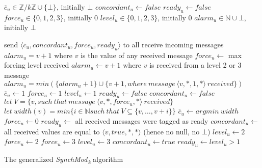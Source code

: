 \documentclass[11pt,letterpaper]{article}
\newcommand{\SM}{{\em SynchMod}$_{\,k}\ $}
\begin{document}
\begin{algorithm}[htb]\label{algo:code}
\begin{distribalgo}[1]
\BLANK {}
	\STATE $\overline{c}_u \in \mathds{Z}/k\mathds{Z} \cup \{\bot\}$, initially $\bot$
	\STATE $concordant_u \leftarrow false$
	\STATE $ready_u \leftarrow false$
	\STATE $force_u \in \{0, 1, 2, 3\}$, initially 0
	\STATE $level_u \in \{0, 1, 2, 3\}$, initially 0
	\STATE $alarm_u \in \mathds{N} \cup \bot$, initially $\bot$

\ENDINDENT \BLANK

	\STATE send $\langle \overline{c}_u, concordant_u, force_u, ready_u \rangle$ to all 
	\STATE receive incoming messages
		\STATE $alarm_u = v+1$ where $v$ is the value of any received message
	\ENDIF
	\STATE $force_u \leftarrow$ max forcing level received
		\STATE $alarm_u \leftarrow v+1$ where $v$ is received from a level 2 or 3 message
	\ELSE
		\STATE $alarm_u = min (\{alarm_u+1\} \cup \{v+1, where~message~\langle v, *, 1, * \rangle~received\})$
	\ENDIF
		\STATE $\overline{c}_u \leftarrow 1$
		\STATE $force_u \leftarrow 1$
		\STATE $level_u \leftarrow 1$
		\STATE $ready_u \leftarrow false$
		\STATE $concordant_u \leftarrow false$
	\ELSE
		\STATE $let~V = \{v, such~that~message~\langle v, *, force_u, * \rangle~received\}$
		\STATE $let~width(v) = min \{i \in \mathds{N} such~that~V \subseteq \{v, \dots, v+i\}\}$
		\STATE $\overline{c}_u \leftarrow argmin~width$
			\STATE $force_u \leftarrow 0$
		\ENDIF
		\STATE $ready_u \leftarrow$ all received messages were tagged as ready
		\STATE $concordant_u \leftarrow$ all received values are equal to $\langle v, true, *, * \rangle$ (hence no null, no $\bot$) \label{line:conc_gossip}
	\ENDIF
		\STATE $level_u \leftarrow 2$
		\STATE $force_u \leftarrow 2$
	\ENDIF
		\STATE $force_u \leftarrow 3$
		\STATE $level_u \leftarrow 3$
	\ENDIF
		\STATE $concordant_u \leftarrow true$
		\STATE $ready_u \leftarrow level_u > 1$
	\ENDIF
\ENDINDENT 

\caption{The generalized \SM algorithm} \label{algo:R}
\end{distribalgo}

\end{algorithm}
\end{document}
